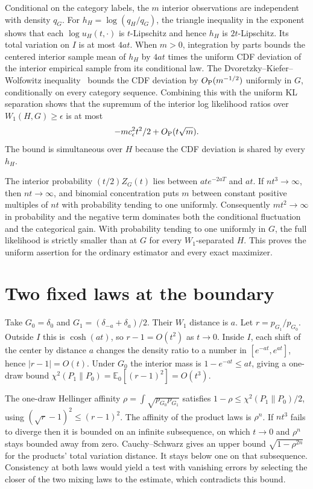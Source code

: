 \documentclass[11pt]{amsart}
\begin{document}
Conditional on the category labels, the \(m\) interior observations are independent with density \(q_G\). For \(h_H=\log(q_H/q_G)\), the triangle inequality in the exponent shows that each \(\log u_H(t,\cdot)\) is \(t\)-Lipschitz and hence \(h_H\) is \(2t\)-Lipschitz. Its total variation on \(I\) is at most \(4at\). When \(m>0\), integration by parts bounds the centered interior sample mean of \(h_H\) by \(4at\) times the uniform CDF deviation of the interior empirical sample from its conditional law. The Dvoretzky--Kiefer--Wolfowitz inequality~\cite{M} bounds the CDF deviation by \(O_{\rm P}(m^{-1/2})\) uniformly in \(G\), conditionally on every category sequence. Combining this with the uniform KL separation shows that the supremum of the interior log likelihood ratios over \(W_1(H,G)\ge\epsilon\) is at most
\[
                  -m c_\epsilon^2t^2/2+O_{\rm P}(t\sqrt m).
\]
The bound is simultaneous over \(H\) because the CDF deviation is shared by every \(h_H\).

The interior probability \((t/2)Z_G(t)\) lies between \(at e^{-2aT}\) and \(at\). If \(nt^3\to\infty\), then \(nt\to\infty\), and binomial concentration puts \(m\) between constant positive multiples of \(nt\) with probability tending to one uniformly. Consequently \(mt^2\to\infty\) in probability and the negative term dominates both the conditional fluctuation and the categorical gain. With probability tending to one uniformly in \(G\), the full likelihood is strictly smaller than at \(G\) for every \(W_1\)-separated \(H\). This proves the uniform assertion for the ordinary estimator and every exact maximizer.

\section{Two fixed laws at the boundary}
Take \(G_0=\delta_0\) and \(G_1=(\delta_{-a}+\delta_a)/2\). Their \(W_1\) distance is \(a\). Let \(r=p_{G_1}/p_{G_0}\). Outside \(I\) this is \(\cosh(at)\), so \(r-1=O(t^2)\) as \(t\to0\). Inside \(I\), each shift of the center by distance \(a\) changes the density ratio to a number in \([e^{-at},e^{at}]\), hence \(|r-1|=O(t)\). Under \(G_0\) the interior mass is \(1-e^{-at}\le at\), giving a one-draw bound \(\chi^2(P_1\|P_0)=\mathbb E_0[(r-1)^2]=O(t^3)\).

The one-draw Hellinger affinity \(\rho=\int\sqrt{p_{G_0}p_{G_1}}\) satisfies \(1-\rho\le\chi^2(P_1\|P_0)/2\), using \((\sqrt{r}-1)^2\le(r-1)^2\). The affinity of the product laws is \(\rho^n\). If \(nt^3\) fails to diverge then it is bounded on an infinite subsequence, on which \(t\to0\) and \(\rho^n\) stays bounded away from zero. Cauchy--Schwarz gives an upper bound \(\sqrt{1-\rho^{2n}}\) for the products' total variation distance. It stays below one on that subsequence. Consistency at both laws would yield a test with vanishing errors by selecting the closer of the two mixing laws to the estimate, which contradicts this bound.
\end{document}
